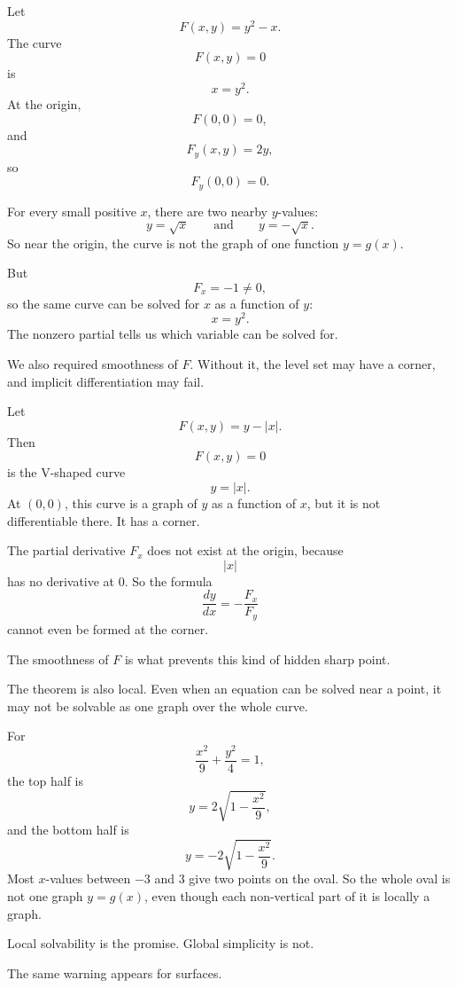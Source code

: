 \begin{example}[When \(F_y=0\), \(y\) may not be a function of \(x\)]
Let
\[
    F(x,y)=y^2-x.
\]
The curve
\[
    F(x,y)=0
\]
is
\[
    x=y^2.
\]
At the origin,
\[
    F(0,0)=0,
\]
and
\[
    F_y(x,y)=2y,
\]
so
\[
    F_y(0,0)=0.
\]

For every small positive \(x\), there are two nearby \(y\)-values:
\[
    y=\sqrt{x}
    \qquad\text{and}\qquad
    y=-\sqrt{x}.
\]
So near the origin, the curve is not the graph of one function \(y=g(x)\).

But
\[
    F_x=-1\ne0,
\]
so the same curve can be solved for \(x\) as a function of \(y\):
\[
    x=y^2.
\]
The nonzero partial tells us which variable can be solved for.
\end{example}

We also required smoothness of \(F\).  Without it, the level set may have a corner, and
implicit differentiation may fail.

\begin{example}
Let
\[
    F(x,y)=y-|x|.
\]
Then
\[
    F(x,y)=0
\]
is the V-shaped curve
\[
    y=|x|.
\]
At \((0,0)\), this curve is a graph of \(y\) as a function of \(x\), but it is not
differentiable there.  It has a corner.

The partial derivative \(F_x\) does not exist at the origin, because
\[
    |x|
\]
has no derivative at \(0\).  So the formula
\[
    \frac{dy}{dx}=-\frac{F_x}{F_y}
\]
cannot even be formed at the corner.

The smoothness of \(F\) is what prevents this kind of hidden sharp point.
\end{example}

The theorem is also local.  Even when an equation can be solved near a point, it may
not be solvable as one graph over the whole curve.

\begin{example}
For
\[
    \frac{x^2}{9}+\frac{y^2}{4}=1,
\]
the top half is
\[
    y=2\sqrt{1-\frac{x^2}{9}},
\]
and the bottom half is
\[
    y=-2\sqrt{1-\frac{x^2}{9}}.
\]
Most \(x\)-values between \(-3\) and \(3\) give two points on the oval.  So the whole
oval is not one graph \(y=g(x)\), even though each non-vertical part of it is locally a
graph.

Local solvability is the promise.  Global simplicity is not.
\end{example}

The same warning appears for surfaces.

